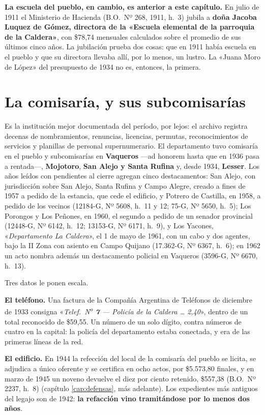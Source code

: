 \textbf{La escuela del pueblo, en cambio, es anterior a este capítulo.} En julio de 1911 el
Ministerio de Hacienda (B.O.\ Nº 268, 1911, h.\ 3) jubila a \textbf{doña Jacoba Luquez de Gómez, directora de la «Escuela
elemental de la parroquia de la Caldera»}, con \$78,74 mensuales calculados sobre el promedio de
sus últimos cinco años. La jubilación prueba dos cosas: que en
1911 había escuela en el pueblo y que su directora llevaba allí, por lo menos, un lustro. La
«Juana Moro de López» del presupuesto de 1934 no es, entonces, la primera.

\section{La comisaría, y sus subcomisarías}

Es la institución mejor documentada del período, por lejos: el archivo registra decenas de
nombramientos, renuncias, licencias, permutas, reconocimientos de servicios y planillas de
personal supernumerario. El departamento tuvo comisaría en el pueblo y subcomisarías en
\textbf{Vaqueros} ---ad honorem hasta que en 1936 pasa a rentada---, \textbf{Mojotoro},
\textbf{San Alejo y Santa Rufina} y, desde 1934, \textbf{Lesser}. Los años leídos con pendientes al cierre agregan cinco destacamentos: San Alejo, con jurisdicción sobre San Alejo, Santa Rufina y Campo Alegre, creado a fines de 1957 a pedido de la estancia, que cede el edificio, y Potrero de Castilla, en 1958, a pedido de los vecinos (12184-G, Nº 5608, h.\ 11 y 12; 75-G, Nº 5650, h.\ 5); Los Porongos y Los Peñones, en 1960, el segundo a pedido de un senador provincial (12448-G, Nº 6142, h.\ 12; 13153-G, Nº 6171, h.\ 9), y Los Yacones, «\textit{Departamento La Caldera}», el 1 de mayo de 1961, con un cabo y dos agentes, bajo la II Zona con asiento en Campo Quijano (17.362-G, Nº 6367, h.\ 6); en 1962 un acto nombra además un destacamento policial en Vaqueros (3596-G, Nº 6670, h.\ 13).

Tres datos le ponen escala.

\textbf{El teléfono.} Una factura de la Compañía Argentina de Teléfonos de diciembre de 1933
consigna «\textit{Telef.\ N\textsuperscript{o} \textbf{7} --- Policía de la Caldera \dots{} 2,40}», dentro de un total
reconocido de \$59,55. Un número de un solo dígito, contra números de cuatro en la capital: la
policía del departamento estaba conectada, y era de las primeras líneas de la red.

\textbf{El edificio.} En 1944 la refección del local de la comisaría del pueblo se licita, se
adjudica a único oferente y se certifica en ocho actos, por \$5.573,80 finales, y en marzo de
1945 un noveno devuelve el diez por ciento retenido, \$557,38 (B.O.\ Nº 2237, h.\ 8)
(capítulo \ref{cap:defensas}, más adelante). Los expedientes más antiguos del legajo son de 1942: \textbf{la
refacción vino tramitándose por lo menos dos años}.

